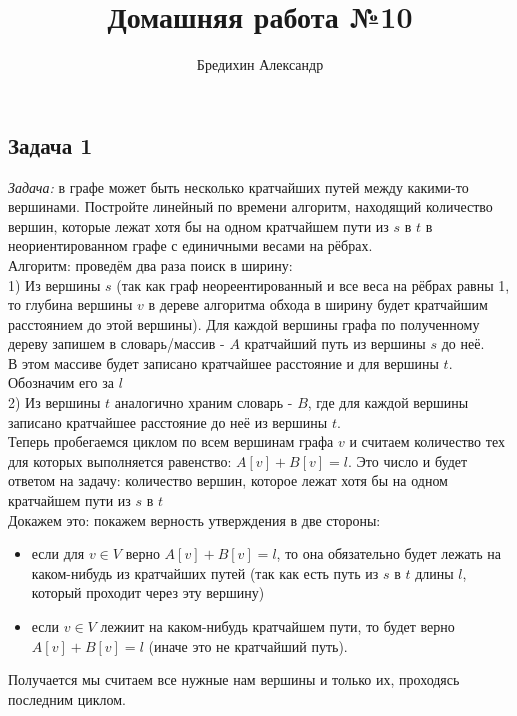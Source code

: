 \documentclass[a4paper,12pt]{article} %
\author{Бредихин Александр}
\title{Домашняя работа №10}
\begin{document}
\maketitle

\subsection*{Задача 1}
\textit{Задача:} в графе может быть несколько кратчайших путей между какими-то вершинами. Постройте линейный по времени алгоритм, находящий количество вершин, которые лежат хотя бы на одном кратчайшем пути из $s$ в $t$ в неориентированном графе с единичными весами на рёбрах.\\

Алгоритм: проведём два раза поиск в ширину:\\
1) Из вершины $ s $ (так как граф неореентированный и все веса на рёбрах равны 1, то глубина вершины $ v $ в дереве алгоритма обхода в ширину будет кратчайшим расстоянием до этой вершины). Для каждой вершины графа по полученному дереву запишем в словарь/массив - $ A $ кратчайший путь из вершины $ s $ до неё.\\
В этом массиве будет записано кратчайшее расстояние и для вершины $ t $. Обозначим его за $ l $\\
2) Из вершины $ t $ аналогично храним словарь - $ B $, где для каждой вершины записано кратчайшее расстояние до неё из вершины $ t $.\\
Теперь пробегаемся циклом по всем вершинам графа $ v $ и считаем количество тех для которых выполняется равенство: $ A[v] + B[v] = l$. Это число и будет ответом на задачу: количество вершин, которое лежат хотя бы на одном кратчайшем пути из $ s $ в $ t $\\

Докажем это: покажем верность утверждения в две стороны: \\
\begin{itemize}
\item если для $ v \in V $ верно $ A[v] + B[v] = l$, то она обязательно будет лежать на каком-нибудь из кратчайших путей (так как есть путь из $ s $ в $ t $ длины $ l $, который проходит через эту вершину)\\
\item если $ v \in V $ лежиит на каком-нибудь кратчайшем пути, то будет верно $ A[v] + B[v] = l$ (иначе это не кратчайший путь).\\
\end{itemize}
Получается мы считаем все нужные нам вершины и только их, проходясь последним циклом.\\
\end{document}
